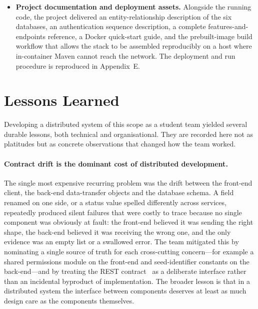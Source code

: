 \begin{itemize}
  \item \textbf{Project documentation and deployment assets.} Alongside the running code,
        the project delivered an entity-relationship description of the six databases, an
        authentication sequence description, a complete features-and-endpoints reference, a
        Docker quick-start guide, and the prebuilt-image build workflow that allows the
        stack to be assembled reproducibly on a host where in-container Maven cannot reach
        the network. The deployment and run procedure is reproduced in Appendix~E.
\end{itemize}

\section{Lessons Learned}
\label{sec:lessons}

Developing a distributed system of this scope as a student team yielded several
durable lessons, both technical and organisational. They are recorded here not as
platitudes but as concrete observations that changed how the team worked.

\paragraph{Contract drift is the dominant cost of distributed development.}
The single most expensive recurring problem was the drift between the front-end client,
the back-end data-transfer objects and the database schema. A field renamed on one side,
or a status value spelled differently across services, repeatedly produced silent
failures that were costly to trace because no single component was obviously at fault: the
front-end believed it was sending the right shape, the back-end believed it was receiving
the wrong one, and the only evidence was an empty list or a swallowed error. The team
mitigated this by nominating a single source of truth for each cross-cutting concern---for
example a shared permissions module on the front-end and seed-identifier constants on the
back-end---and by treating the REST contract~\cite{restapi} as a deliberate interface
rather than an incidental byproduct of implementation. The broader lesson is that in a
distributed system the interface between components deserves at least as much design care as
the components themselves.

